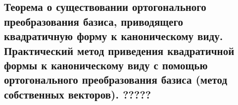 {
\subsection{Теорема о существовании ортогонального преобразования базиса, приводящего квадратичную форму к каноническому виду. Практический метод приведения квадратичной формы к каноническому виду с помощью ортогонального преобразования базиса (метод собственных векторов).  ?????}
}